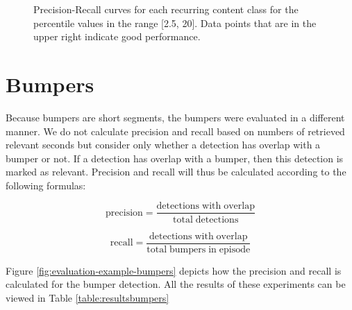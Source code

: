 \documentclass{report}
\begin{document}
\begin{figure}[h]
	\centering
	\caption{Precision-Recall curves for each recurring content class for the percentile values in the range [2.5, 20]. Data points that are in the upper right indicate good performance.}
	\label{fig:precision-recall}
\end{figure}

\section{Bumpers}
Because bumpers are short segments, the bumpers were evaluated in a different manner. We do not calculate precision and recall based on numbers of retrieved relevant seconds but consider only whether a detection has overlap with a bumper or not. If a detection has overlap with a bumper, then this detection is marked as relevant. Precision and recall will thus be calculated according to the following formulas:

\[\mathrm{precision} = \frac{\mathrm{detections\;with\;overlap}}{\mathrm{total\;detections}}\]

\[\mathrm{recall} = \frac{\mathrm{detections\;with\;overlap}}{\mathrm{total\;bumpers\;in\;episode}}\]

Figure \ref{fig:evaluation-example-bumpers} depicts how the precision and recall is calculated for the bumper detection. All the results of these experiments can be viewed in Table \ref{table:resultsbumpers}
\end{document}
